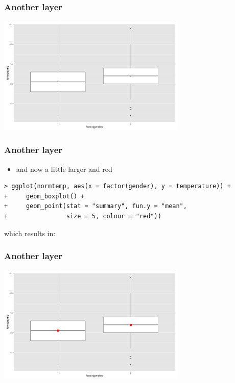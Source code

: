 \documentclass[xcolor={table}]{beamer}
\begin{document}
\begin{frame}\frametitle{Another layer}
  \begin{center}
    \includegraphics[width=9cm]{boxplotmean.png}
  \end{center}
\end{frame}

\begin{frame}[fragile]\frametitle{Another layer}
  \begin{itemize}
  \item and now a little larger and red
  \end{itemize}\small
\begin{verbatim}
> ggplot(normtemp, aes(x = factor(gender), y = temperature)) +
+     geom_boxplot() +
+     geom_point(stat = "summary", fun.y = "mean",
+                size = 5, colour = "red"))
\end{verbatim}
which results in:
\end{frame}

\begin{frame}\frametitle{Another layer}
  \begin{center}
    \includegraphics[width=9cm]{boxplotmean2.png}
  \end{center}
\end{frame}
\end{document}
